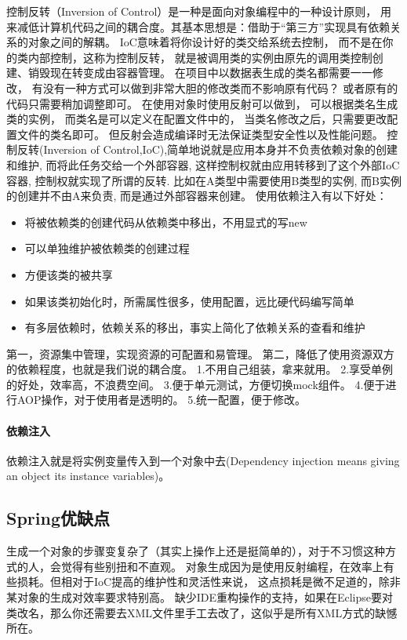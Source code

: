 \documentclass{book}
\begin{document}
控制反转（Inversion of Control）是一种是面向对象编程中的一种设计原则，
用来减低计算机代码之间的耦合度。其基本思想是：借助于“第三方”实现具有依赖关系的对象之间的解耦。
IoC意味着将你设计好的类交给系统去控制，
而不是在你的类内部控制，这称为控制反转，
就是被调用类的实例由原先的调用类控制创建、销毁现在转变成由容器管理。
在项目中以数据表生成的类名都需要一一修改，
有没有一种方式可以做到非常大胆的修改类而不影响原有代码？
或者原有的代码只需要稍加调整即可。
在使用对象时使用反射可以做到，
可以根据类名生成类的实例，
而类名是可以定义在配置文件中的，
当类名修改之后，只需要更改配置文件的类名即可。
但反射会造成编译时无法保证类型安全性以及性能问题。
控制反转(Inversion of Control,IoC),简单地说就是应用本身并不负责依赖对象的创建和维护,
而将此任务交给一个外部容器,
这样控制权就由应用转移到了这个外部IoC容器,
控制权就实现了所谓的反转.
比如在A类型中需要使用B类型的实例,
而B实例的创建并不由A来负责,
而是通过外部容器来创建。
使用依赖注入有以下好处：

\begin{itemize}
	\item{将被依赖类的创建代码从依赖类中移出，不用显式的写new}
	\item{可以单独维护被依赖类的创建过程}
	\item{方便该类的被共享}
	\item{如果该类初始化时，所需属性很多，使用配置，远比硬代码编写简单}
	\item{有多层依赖时，依赖关系的移出，事实上简化了依赖关系的查看和维护}
\end{itemize}

第一，资源集中管理，实现资源的可配置和易管理。
第二，降低了使用资源双方的依赖程度，也就是我们说的耦合度。
1.不用自己组装，拿来就用。
2.享受单例的好处，效率高，不浪费空间。
3.便于单元测试，方便切换mock组件。
4.便于进行AOP操作，对于使用者是透明的。
5.统一配置，便于修改。

\paragraph{依赖注入}

依赖注入就是将实例变量传入到一个对象中去(Dependency injection means giving an object its instance variables)。

\subsection{Spring优缺点}

生成一个对象的步骤变复杂了（其实上操作上还是挺简单的），对于不习惯这种方式的人，会觉得有些别扭和不直观。
对象生成因为是使用反射编程，在效率上有些损耗。但相对于IoC提高的维护性和灵活性来说，
这点损耗是微不足道的，除非某对象的生成对效率要求特别高。
缺少IDE重构操作的支持，如果在Eclipse要对类改名，那么你还需要去XML文件里手工去改了，这似乎是所有XML方式的缺憾所在。
\end{document}
